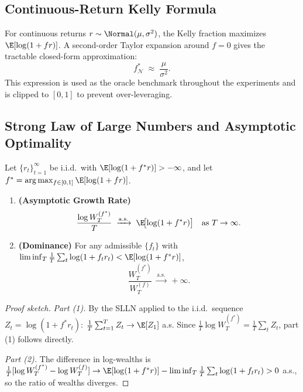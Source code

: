 \subsection{Continuous-Return Kelly Formula}

For continuous returns $r \sim \Normal(\mu,\sigma^2)$, the Kelly fraction
maximizes $\E[\log(1+fr)]$.  A second-order Taylor expansion around $f=0$
gives the tractable closed-form approximation:
\begin{equation}
    f^*_{\mathcal{N}} \;\approx\; \frac{\mu}{\sigma^2}.
    \label{eq:gaussian_kelly}
\end{equation}
This expression is used as the oracle benchmark throughout the experiments
and is clipped to $[0,1]$ to prevent over-leveraging.

\subsection{Strong Law of Large Numbers and Asymptotic Optimality}

\begin{theorem}
\label{thm:kelly_slln}
Let $\{r_t\}_{t=1}^\infty$ be i.i.d.\ with
$\E[\log(1+f^*r)] > -\infty$, and let
$f^* = \arg\max_{f\in[0,1]}\E[\log(1+fr)]$.
\begin{enumerate}
    \item \textbf{(Asymptotic Growth Rate)}
    \[
        \frac{\log W_T^{(f^*)}}{T}
        \;\xrightarrow{\mathrm{a.s.}}\;
        \E\!\bigl[\log(1+f^*r)\bigr]
        \quad\text{as } T\to\infty.
    \]
    \item \textbf{(Dominance)} For any admissible $\{f_t\}$ with
    $\liminf_T \frac{1}{T}\sum_t \log(1+f_t r_t)
    < \E[\log(1+f^*r)]$,
    \[
        \frac{W_T^{(f^*)}}{W_T^{(f)}}
        \;\xrightarrow{\mathrm{a.s.}}\; +\infty.
    \]
\end{enumerate}
\end{theorem}

\begin{proof}[Proof sketch]
\textit{Part (1).}  By the SLLN applied to the i.i.d.\ sequence
$Z_t = \log(1+f^*r_t)$:
$\frac{1}{T}\sum_{t=1}^T Z_t \to \E[Z_1]$ a.s.
Since $\frac{1}{T}\log W_T^{(f^*)} = \frac{1}{T}\sum_t Z_t$, part (1)
follows directly.

\textit{Part (2).}  The difference in log-wealths is
$\frac{1}{T}[\log W_T^{(f^*)} - \log W_T^{(f)}]
\to \E[\log(1+f^*r)] - \liminf_T\frac{1}{T}\sum_t\log(1+f_t r_t) > 0$
a.s., so the ratio of wealths diverges.
\end{proof}

